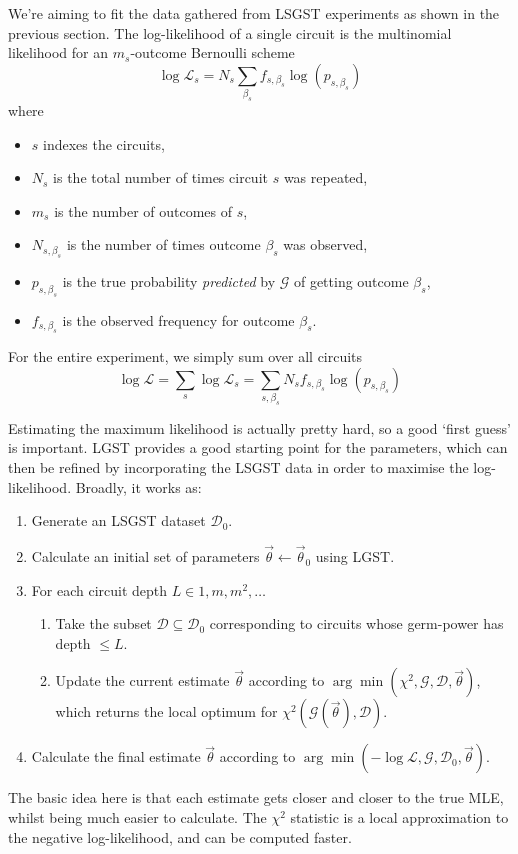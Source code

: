 We're aiming to fit the data gathered from \ac{LSGST} experiments as shown in the previous section.
The log-likelihood of a single circuit is the multinomial likelihood for an $m_s$-outcome Bernoulli
scheme
\begin{equation}
    \log \mathcal{L}_s = N_s \sum_{\beta_s} f_{s, \beta_s} \log(p_{s, \beta_s})
\end{equation}
where 
\begin{itemize}
    \item $s$ indexes the circuits,
    \item $N_s$ is the total number of times circuit $s$ was repeated,
    \item $m_s$ is the number of outcomes of $s$,
    \item $N_{s, \beta_s}$ is the number of times outcome $\beta_s$ was observed,
    \item $p_{s, \beta_s}$ is the true probability \textit{predicted} by $\mathcal{G}$ of getting
    outcome $\beta_s$,
    \item $f_{s, \beta_s}$ is the observed frequency for outcome $\beta_s$.
\end{itemize}
For the entire experiment, we simply sum over all circuits
\begin{equation}
    \log \mathcal{L} = \sum_s \log \mathcal{L}_s = \sum_{s, \beta_s} N_s f_{s, \beta_s} \log(p_{s, \beta_s})
\end{equation}

Estimating the maximum likelihood is actually pretty hard, so a good `first guess' is important.
\ac{LGST} provides a good starting point for the parameters, which can then be refined by
incorporating the \ac{LSGST} data in order to maximise the log-likelihood. Broadly, it works as:
\begin{enumerate}
    \item Generate an \ac{LSGST} dataset $\mathcal{D}_0$.
    \item Calculate an initial set of parameters $\vec{\theta} \leftarrow \vec{\theta}_0$ using \ac{LGST}.
    \item For each circuit depth $L \in 1, m, m^2, \dots$
    \begin{enumerate}
        \item Take the subset $\mathcal{D} \subseteq \mathcal{D}_0$ corresponding to circuits whose
        germ-power has depth $\le L$.
        \item Update the current estimate $\vec{\theta}$ according to $\arg \min (\chi^2,
        \mathcal{G}, \mathcal{D}, \vec{\theta})$, which returns the local optimum for $\chi^2
        (\mathcal{G}(\vec{\theta}), \mathcal{D})$.
    \end{enumerate}
    \item Calculate the final estimate $\vec{\theta}$ according to $\arg \min (- \log \mathcal{L},
    \mathcal{G}, \mathcal{D}_0, \vec{\theta})$.
\end{enumerate}
The basic idea here is that each estimate gets closer and closer to the true MLE, whilst being much
easier to calculate. The $\chi^2$ statistic is a local approximation to the negative log-likelihood,
and can be computed faster.

